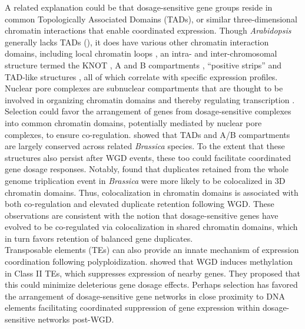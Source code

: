 \documentclass[11pt]{article}
\begin{document}
A related explanation could be that dosage-sensitive gene groups reside in common Topologically Associated Domains (TADs), or similar three-dimensional chromatin interactions that enable coordinated expression.
Though \textit{Arabidopsis} generally lacks TADs (\citep{liu2017}), it does have various other chromatin interaction domains, including local chromatin loops \citep{liu2017}, an intra- and inter-chromosomal structure termed the KNOT \citep{grob2014, grob2017}, A and B compartments \citep{grob2014}, ``positive strips'' and TAD-like structures \citep{wang2015}, all of which  correlate with specific expression profiles.
Nuclear pore complexes are subnuclear compartments that are thought to be involved in organizing chromatin domains and thereby regulating transcription \citep{sun2019}.
Selection could favor the arrangement of genes from dosage-sensitive complexes into common chromatin domains, potentially mediated by nuclear pore complexes, to ensure co-regulation.
\cite{xie2019} showed that TADs and A/B compartments are largely conserved across related \textit{Brassica} species.
To the extent that these structures also persist after WGD events, these too could facilitate coordinated gene dosage responses.
Notably, \cite{xie2019} found that duplicates retained from the whole genome triplication event in \textit{Brassica} were more likely to be colocalized in 3D chromatin domains.
Thus, colocalization in chromatin domains is associated with both co-regulation and elevated duplicate retention following WGD.
These observations are consistent with the notion that dosage-sensitive genes have evolved to be co-regulated via colocalization in shared chromatin domains, which in turn favors retention of balanced gene duplicates.\\

Transposable elements (TEs) can also provide an innate mechanism of expression coordination following polyploidization.
\cite{zhang2015} showed that WGD induces methylation in Class II TEs, which suppresses expression of nearby genes.
They proposed that this could minimize deleterious gene dosage effects.
Perhaps selection has favored the arrangement of dosage-sensitive gene networks in close proximity to DNA elements facilitating coordinated suppression of gene expression within dosage-sensitive networks post-WGD.\\
\end{document}
